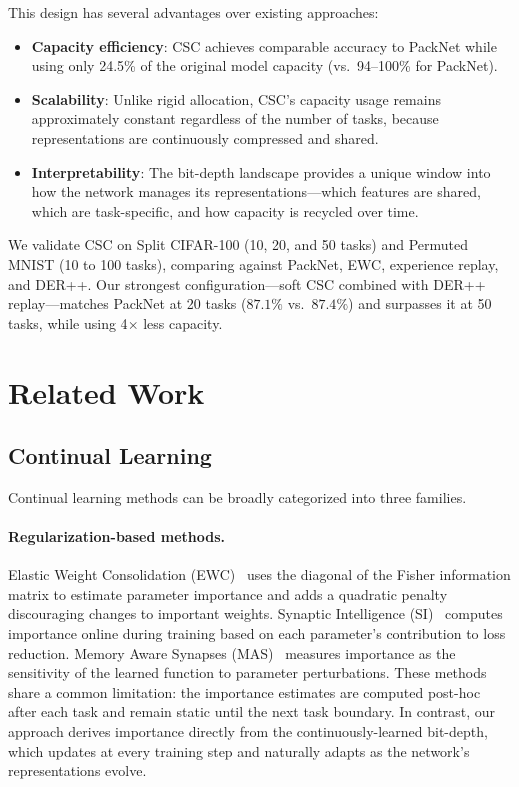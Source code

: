 \documentclass[11pt]{article}
\begin{document}
This design has several advantages over existing approaches:
\begin{itemize}
    \item \textbf{Capacity efficiency}: CSC achieves comparable accuracy to PackNet while using only 24.5\% of the original model capacity (vs.\ 94--100\% for PackNet).
    \item \textbf{Scalability}: Unlike rigid allocation, CSC's capacity usage remains approximately constant regardless of the number of tasks, because representations are continuously compressed and shared.
    \item \textbf{Interpretability}: The bit-depth landscape provides a unique window into how the network manages its representations---which features are shared, which are task-specific, and how capacity is recycled over time.
\end{itemize}

We validate CSC on Split CIFAR-100 (10, 20, and 50 tasks) and Permuted MNIST (10 to 100 tasks), comparing against PackNet, EWC, experience replay, and DER++.
Our strongest configuration---soft CSC combined with DER++ replay---matches PackNet at 20 tasks ($87.1\%$ vs.\ $87.4\%$) and surpasses it at 50 tasks, while using 4$\times$ less capacity.

\section{Related Work}
\label{sec:related}

\subsection{Continual Learning}

Continual learning methods can be broadly categorized into three families.

\paragraph{Regularization-based methods.}
Elastic Weight Consolidation (EWC)~\citep{kirkpatrick2017overcoming} uses the diagonal of the Fisher information matrix to estimate parameter importance and adds a quadratic penalty discouraging changes to important weights.
Synaptic Intelligence (SI)~\citep{zenke2017continual} computes importance online during training based on each parameter's contribution to loss reduction.
Memory Aware Synapses (MAS)~\citep{aljundi2018memory} measures importance as the sensitivity of the learned function to parameter perturbations.
These methods share a common limitation: the importance estimates are computed post-hoc after each task and remain static until the next task boundary.
In contrast, our approach derives importance directly from the continuously-learned bit-depth, which updates at every training step and naturally adapts as the network's representations evolve.
\end{document}

